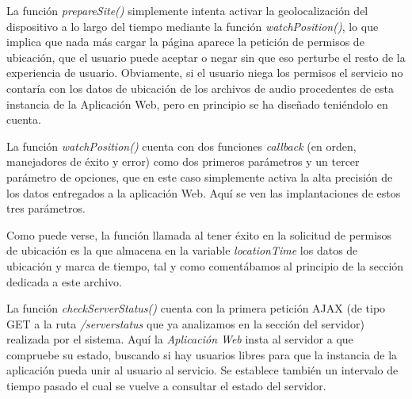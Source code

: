 La función \emph{prepareSite()} simplemente intenta activar la geolocalización del dispositivo a lo largo del tiempo mediante la función \emph{watchPosition()}, lo que implica que nada más cargar la página aparece la petición de permisos de ubicación, que el usuario puede aceptar o negar sin que eso perturbe el resto de la experiencia de usuario. Obviamente, si el usuario niega los permisos el servicio no contaría con los datos de ubicación de los archivos de audio procedentes de esta instancia de la Aplicación Web, pero en principio se ha diseñado teniéndolo en cuenta.

La función \emph{watchPosition()} cuenta con dos funciones \emph{callback} (en orden, manejadores de éxito y error) como dos primeros parámetros y un tercer parámetro de opciones, que en este caso simplemente activa la alta precisión de los datos entregados a la aplicación Web. Aquí se ven las implantaciones de estos tres parámetros.


Como puede verse, la función llamada al tener éxito en la solicitud de permisos de ubicación es la que almacena en la variable \emph{locationTime} los datos de ubicación y marca de tiempo, tal y como comentábamos al principio de la sección dedicada a este archivo.

La función \emph{checkServerStatus()} cuenta con la primera petición AJAX (de tipo GET a la ruta \emph{/serverstatus} que ya analizamos en la sección del servidor) realizada por el sistema. Aquí la \emph{Aplicación Web} insta al servidor a que compruebe su estado, buscando si hay usuarios libres para que la instancia de la aplicación pueda unir al usuario al servicio. Se establece también un intervalo de tiempo pasado el cual se vuelve a consultar el estado del servidor.


